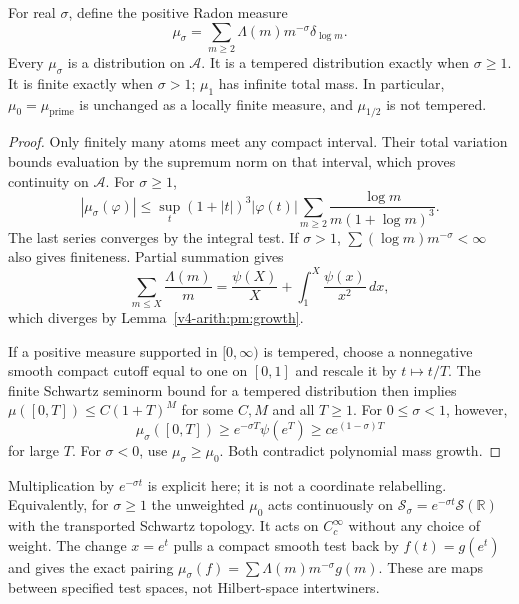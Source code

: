 \begin{theorem}
\label{v4-arith:pm:weights}
For real $\sigma$, define the positive Radon measure
\[
 \mu_\sigma=\sum_{m\geq2}\Lambda(m)m^{-\sigma}\delta_{\log m}.
\]
Every $\mu_\sigma$ is a distribution on $\mathscr A$.
It is a tempered distribution exactly when $\sigma\geq1$.
It is finite exactly when $\sigma>1$; $\mu_1$ has infinite total mass.
In particular, $\mu_0=\mu_{\mathrm{prime}}$ is unchanged as a
locally finite measure, and $\mu_{1/2}$ is not tempered.
\end{theorem}
\begin{proof}
Only finitely many atoms meet any compact interval. Their total
variation bounds evaluation by the supremum norm on that interval,
which proves continuity on $\mathscr A$.
For $\sigma\geq1$,
\[
 |\mu_\sigma(\varphi)|
 \leq\sup_t(1+|t|)^3|\varphi(t)|
       \sum_{m\geq2}\frac{\log m}{m(1+\log m)^3}.
\]
The last series converges by the integral test. If $\sigma>1$,
$\sum(\log m)m^{-\sigma}<\infty$ also gives finiteness.
Partial summation gives
\[
 \sum_{m\leq X}\frac{\Lambda(m)}m
 =\frac{\psi(X)}X+\int_1^X\frac{\psi(x)}{x^2}\,dx,
\]
which diverges by Lemma~\ref{v4-arith:pm:growth}.

If a positive measure supported in $[0,\infty)$ is tempered, choose
a nonnegative smooth compact cutoff equal to one on $[0,1]$ and
rescale it by $t\mapsto t/T$. The finite Schwartz seminorm bound
for a tempered distribution then implies
$\mu([0,T])\leq C(1+T)^M$ for some $C,M$ and all $T\geq1$.
For $0\leq\sigma<1$, however,
\[
 \mu_\sigma([0,T])\geq e^{-\sigma T}\psi(e^T)
                  \geq c e^{(1-\sigma)T}
\]
for large $T$. For $\sigma<0$, use $\mu_\sigma\geq\mu_0$.
Both contradict polynomial mass growth.
\end{proof}

Multiplication by $e^{-\sigma t}$ is explicit here; it is not a
coordinate relabelling. Equivalently, for $\sigma\geq1$ the
unweighted $\mu_0$ acts continuously on
$\mathscr S_\sigma=e^{-\sigma t}\mathscr S(\mathbb R)$ with the
transported Schwartz topology. It acts on $C_c^\infty$ without any
choice of weight. The change $x=e^t$ pulls a compact smooth test
back by $f(t)=g(e^t)$ and gives the exact pairing
$\mu_\sigma(f)=\sum\Lambda(m)m^{-\sigma}g(m)$.
These are maps between specified test spaces, not Hilbert-space
intertwiners.

